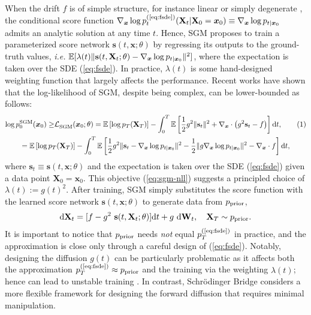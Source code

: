 \documentclass{article}
\def\eqref#1{(\ref{#1})}
\def\rd{{\textnormal{d}}}
\def\rvs{{\mathbf{s}}}
\def\rvX{{\mathbf{X}}}
\def\vx{{\bm{x}}}
\newcommand{\E}{\mathbb{E}}
\def\wt{{ \mathbf{W}_t }}
\def\dwt{{ \mathrm{d} \wt }}
\newcommand{\norm}[1]{\lVert#1\rVert}
\def\dt{{ \mathrm{d} t }}
\def\calL{{\cal L}}
\newcommand{\br}[1]{\left[#1\right]}
\newcommand{\pr}[1]{\left(#1\right)}
\newcommand{\ie}{{\ignorespaces\emph{i.e.}}{ }}
\newcommand\numberthis{\addtocounter{equation}{1}\tag{\theequation}}
\begin{document}
When the drift $f$ is of simple structure,
for instance linear \citep{ho2020denoising} or simply degenerate \citep{song2019generative},
the conditional score function
$\nabla_\vx\log p_t^{\text{\eqref{eq:fsde}}}(\rvX_t| \rvX_0=\vx_0) \equiv \nabla_\vx\log p_{t|\vx_0}$
 admits an analytic solution at any time $t$.
Hence,
SGM proposes to train a parameterized score network $\rvs(t,\vx; \theta)$
by regressing its outputs to the ground-truth values, \ie
$\E[ \lambda(t) \norm{\rvs(t,\rvX_t; \theta) - \condscore}^2 ]$,
where {the expectation is taken over the SDE \eqref{eq:fsde}}.
In practice, $\lambda(t)$ is some hand-designed weighting function that largely affects the performance.
Recent works \citep{song2021maximum,huang2021variational} have shown that
the log-likelihood of SGM, despite being complex, can be lower-bounded as follows:
\begin{align*}
    &{\log \pp{0}{SGM}(\vx_0) \ge }\calL^{\text{}}_{\text{SGM}}(\vx_0; \theta)
    =          \E\br{\log p_T(\rvX_T)} - \int_0^T \E \br{
       \frac{1}{2}g^2\norm{\rvs_t}^2 + \nabla_\vx \cdot \pr{g^2\rvs_t - f}
    } \dt, \numberthis \label{eq:sgm-nll} \\
    &\qquad= \E\br{\log p_T(\rvX_T)} - \int_0^T \E \br{
       \frac{1}{2}g^2\norm{\rvs_t - \condscore}^2 - \frac{1}{2}\norm{g\condscore}^2 - \nabla_\vx \cdot f
    } \dt,
\end{align*}
    where $\rvs_t\equiv\rvs(t,\vx; \theta)$  and the expectation is taken over the SDE \eqref{eq:fsde} given
    a data point $\rvX_0 = \vx_0$.
This objective \eqref{eq:sgm-nll}
suggests a principled choice of $\lambda(t) := g(t)^2$.
After training, SGM simply substitutes the score function with the learned score network $\rvs(t,\vx; \theta)$
to generate data from ${ p_\text{\normalfont{prior}} }$,
\begin{align}
\rd \rvX_t = [f - g^2~\rvs(t,\rvX_t; \theta) ] \dt + g~\dwt,
\quad \rvX_T \sim \prior.
\label{eq:sample-sgm}
\end{align}
It is important to notice that ${ p_\text{\normalfont{prior}} }$ needs \emph{not} equal $\pp{T}{\eqref{eq:fsde}}$ in practice,
and the approximation is close only through a careful design of \eqref{eq:fsde}.
Notably,
designing the diffusion $g(t)$ can be particularly problematic
as it affects both the approximation $\pp{T}{\eqref{eq:fsde}} \approx \prior$ and the training via the weighting $\lambda(t)$;
hence can lead to unstable training \citep{nichol2021improved}.
    In contrast, Schr{\"o}dinger Bridge considers a more flexible framework for designing the forward diffusion
    that requires minimal manipulation.
\end{document}
